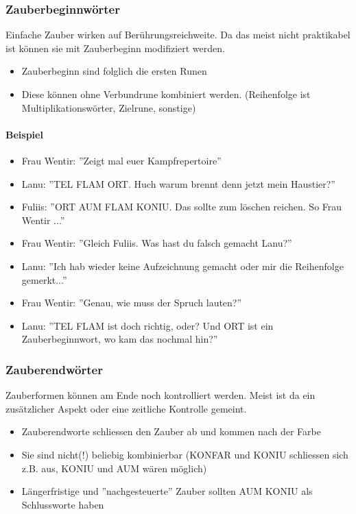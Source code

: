 \documentclass{article}
\begin{document}
\subsubsection{Zauberbeginnwörter}

Einfache Zauber wirken auf Berührungsreichweite. Da das meist nicht praktikabel ist können sie mit Zauberbeginn
modifiziert werden.

\begin{itemize}
\item Zauberbeginn sind folglich die ersten Runen
\item Diese können ohne Verbundrune kombiniert werden. (Reihenfolge ist Multiplikationswörter, Zielrune, sonstige)
\end{itemize}

\paragraph{Beispiel}

\begin{itemize}
\item Frau Wentir: ''Zeigt mal euer Kampfrepertoire''
\item Lanu: ''TEL FLAM ORT. Huch warum brennt denn jetzt mein Haustier?''
\item Fuliis: ''ORT AUM FLAM KONIU. Das sollte zum löschen reichen. So Frau Wentir ...''
\item Frau Wentir: ''Gleich Fuliis. Was hast du falsch gemacht Lanu?''
\item Lanu: ''Ich hab wieder keine Aufzeichnung gemacht oder mir die Reihenfolge gemerkt...''
\item Frau Wentir: ''Genau, wie muss der Spruch lauten?''
\item Lanu: ''TEL FLAM ist doch richtig, oder? Und ORT ist ein Zauberbeginnwort, wo kam das nochmal hin?''
\end{itemize}

\subsubsection{Zauberendwörter}

Zauberformen können am Ende noch kontrolliert werden. Meist ist da ein zusätzlicher Aspekt oder eine zeitliche
Kontrolle gemeint.

\begin{itemize}
\item Zauberendworte schliessen den Zauber ab und kommen nach der Farbe
\item Sie sind nicht(!) beliebig kombinierbar (KONFAR und KONIU schliessen sich z.B. aus, KONIU und AUM wären möglich)
\item Längerfristige und ''nachgesteuerte'' Zauber sollten AUM KONIU als Schlussworte haben
\end{itemize}
\end{document}
